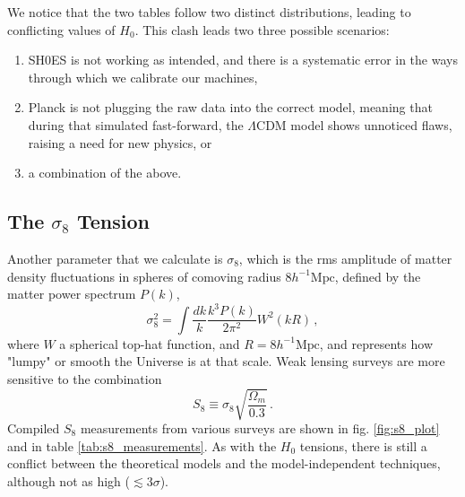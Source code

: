 \documentclass{book}
\begin{document}
	We notice that the two tables follow two distinct distributions, leading to conflicting values of $H_0$. This clash leads two three possible scenarios:
	\begin{enumerate}
		\item SH0ES is not working as intended, and there is a systematic error in the ways through which we calibrate our machines,
		\item Planck is not plugging the raw data into the correct model, meaning that during that simulated fast-forward, the $\Lambda$CDM model shows unnoticed flaws, raising a need for new physics, or
		\item a combination of the above.
	\end{enumerate}
	
	\subsection{The $\sigma_8$ Tension}
	Another parameter that we calculate is $\sigma_8$, which is the rms amplitude of matter density fluctuations in spheres of comoving radius $8h^{-1}\text{Mpc}$, defined by the matter power spectrum $P(k)$,
	\begin{equation}
		\sigma_8^2=\int \frac{dk}{k} \frac{k^3 P(k)}{2\pi^2}W^2(kR) \, ,
	\end{equation}
	where $W$ a spherical top-hat function, and $R=8h^{-1}\text{Mpc}$, and represents how "lumpy" or smooth the Universe is at that scale. Weak lensing surveys are more sensitive to the combination
	\begin{equation}
		S_8\equiv\sigma_8\sqrt{\frac{\Omega_m}{0.3}} \, .
	\end{equation}
	Compiled $S_8$ measurements from various surveys are shown in fig. \ref{fig:s8_plot} and in table \ref{tab:s8_measurements}. As with the $H_0$ tensions, there is still a conflict between the theoretical models and the model-independent techniques, although not as high ($ \lesssim 3\sigma$).
	
\end{document}
